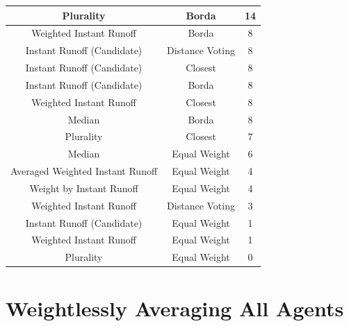 \begin{table}[htbp]
\begin{tabular}{|c|c|c|}
        \hline
        Plurality                        & Borda               & 14                  \\
        \hline
        Weighted Instant Runoff          & Borda               & 8                   \\
        \hline
        Instant Runoff (Candidate)       & Distance Voting     & 8                   \\
        \hline
        Instant Runoff (Candidate)       & Closest             & 8                   \\
        \hline
        Instant Runoff (Candidate)       & Borda               & 8                   \\
        \hline
        Weighted Instant Runoff          & Closest             & 8                   \\
        \hline
        Median                           & Borda               & 8                   \\
        \hline
        Plurality                        & Closest             & 7                   \\
        \hline
        Median                           & Equal Weight        & 6                   \\
        \hline
        Averaged Weighted Instant Runoff & Equal Weight        & 4                   \\
        \hline
        Weight by Instant Runoff         & Equal Weight        & 4                   \\
        \hline
        Weighted Instant Runoff          & Distance Voting     & 3                   \\
        \hline
        Instant Runoff (Candidate)       & Equal Weight        & 1                   \\
        \hline
        Weighted Instant Runoff          & Equal Weight        & 1                   \\
        \hline
        Plurality                        & Equal Weight        & 0                   \\
        \hline
    \end{tabular}
\end{table}


\section{Weightlessly Averaging All Agents}\label{sec:weightless-average-all}


